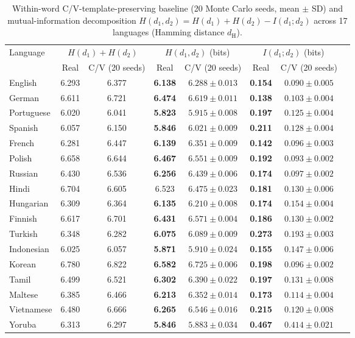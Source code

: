 \documentclass[cm]{glossa}
\begin{document}
\begin{table}[htbp]
\caption{Within-word C/V-template-preserving baseline (20 Monte Carlo seeds, mean $\pm$ SD) and mutual-information decomposition $H(d_1, d_2) = H(d_1) + H(d_2) - I(d_1; d_2)$ across 17 languages (Hamming distance $d_{\text{H}}$).}
\centering\footnotesize
\begin{tabular}{lccccccc}
\toprule
Language & \multicolumn{2}{c}{$H(d_1)+H(d_2)$} & \multicolumn{2}{c}{$H(d_1, d_2)$ (bits)} & \multicolumn{2}{c}{$I(d_1; d_2)$ (bits)} \\
\cmidrule(lr){2-3} \cmidrule(lr){4-5} \cmidrule(lr){6-7}
 & Real & C/V (20 seeds) & Real & C/V (20 seeds) & Real & C/V (20 seeds) \\
\midrule
English    & 6.293 & 6.377 & \textbf{6.138} & $6.288 \pm 0.013$ & \textbf{0.154} & $0.090 \pm 0.005$ \\
German     & 6.611 & 6.721 & \textbf{6.474} & $6.619 \pm 0.011$ & \textbf{0.138} & $0.103 \pm 0.004$ \\
Portuguese & 6.020 & 6.041 & \textbf{5.823} & $5.915 \pm 0.008$ & \textbf{0.197} & $0.125 \pm 0.004$ \\
Spanish    & 6.057 & 6.150 & \textbf{5.846} & $6.021 \pm 0.009$ & \textbf{0.211} & $0.128 \pm 0.004$ \\
French     & 6.281 & 6.447 & \textbf{6.139} & $6.351 \pm 0.009$ & \textbf{0.142} & $0.096 \pm 0.003$ \\
Polish     & 6.658 & 6.644 & \textbf{6.467} & $6.551 \pm 0.009$ & \textbf{0.192} & $0.093 \pm 0.002$ \\
Russian    & 6.430 & 6.536 & \textbf{6.256} & $6.439 \pm 0.006$ & \textbf{0.174} & $0.097 \pm 0.002$ \\
Hindi      & 6.704 & 6.605 & 6.523 & $\mathbf{6.475 \pm 0.023}$ & \textbf{0.181} & $0.130 \pm 0.006$ \\
Hungarian  & 6.309 & 6.364 & \textbf{6.135} & $6.210 \pm 0.008$ & \textbf{0.174} & $0.154 \pm 0.004$ \\
Finnish    & 6.617 & 6.701 & \textbf{6.431} & $6.571 \pm 0.004$ & \textbf{0.186} & $0.130 \pm 0.002$ \\
Turkish    & 6.348 & 6.282 & \textbf{6.075} & $6.089 \pm 0.009$ & \textbf{0.273} & $0.193 \pm 0.003$ \\
Indonesian & 6.025 & 6.057 & \textbf{5.871} & $5.910 \pm 0.024$ & \textbf{0.155} & $0.147 \pm 0.006$ \\
Korean     & 6.780 & 6.822 & \textbf{6.582} & $6.725 \pm 0.006$ & \textbf{0.198} & $0.096 \pm 0.002$ \\
Tamil      & 6.499 & 6.521 & \textbf{6.302} & $6.390 \pm 0.022$ & \textbf{0.197} & $0.131 \pm 0.008$ \\
Maltese    & 6.385 & 6.466 & \textbf{6.213} & $6.352 \pm 0.014$ & \textbf{0.173} & $0.114 \pm 0.004$ \\
Vietnamese & 6.480 & 6.666 & \textbf{6.265} & $6.546 \pm 0.016$ & \textbf{0.215} & $0.120 \pm 0.008$ \\
Yoruba     & 6.313 & 6.297 & \textbf{5.846} & $5.883 \pm 0.034$ & \textbf{0.467} & $0.414 \pm 0.021$ \\
\bottomrule
\end{tabular}
\label{tab:cv_decomp}
\end{table}
\end{document}
